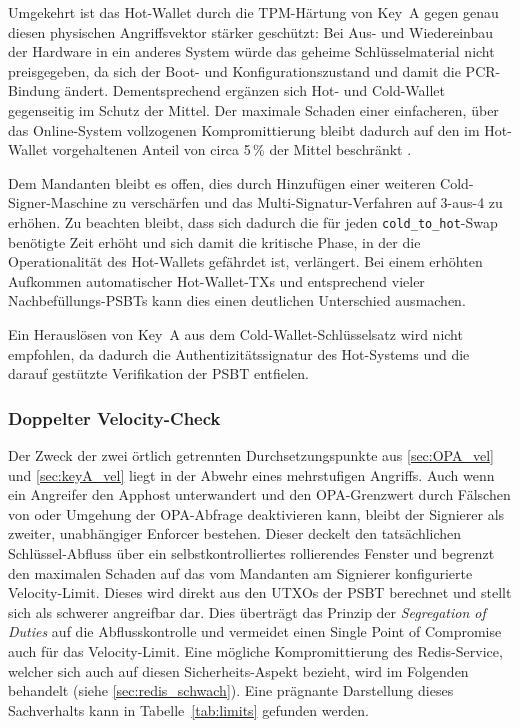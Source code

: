 Umgekehrt ist das Hot-Wallet durch die TPM-Härtung von Key~A gegen genau diesen physischen Angriffsvektor stärker geschützt: Bei Aus- und Wiedereinbau der Hardware in ein anderes System würde das geheime Schlüsselmaterial nicht preisgegeben, da sich der Boot- und Konfigurationszustand und damit die \ac{PCR}-Bindung ändert.
Dementsprechend ergänzen sich Hot- und Cold-Wallet gegenseitig im Schutz der Mittel. Der maximale Schaden einer einfacheren, über das Online-System vollzogenen Kompromittierung bleibt dadurch auf den im Hot-Wallet vorgehaltenen Anteil von circa 5\,\% der Mittel beschränkt \cite{nist_zero_trust}.

Dem Mandanten bleibt es offen, dies durch Hinzufügen einer weiteren Cold-Signer-Maschine zu verschärfen und das Multi-Signatur-Verfahren auf 3-aus-4 zu erhöhen. Zu beachten bleibt, dass sich dadurch die für jeden \texttt{cold\_to\_hot}-Swap benötigte Zeit erhöht und sich damit die kritische Phase, in der die Operationalität des Hot-Wallets gefährdet ist, verlängert. Bei einem erhöhten Aufkommen automatischer Hot-Wallet-\acp{TX} und entsprechend vieler Nachbefüllungs-\acp{PSBT} kann dies einen deutlichen Unterschied ausmachen.

Ein Herauslösen von Key~A aus dem Cold-Wallet-Schlüsselsatz wird nicht empfohlen, da dadurch die Authentizitätssignatur des Hot-Systems und die darauf gestützte Verifikation der \ac{PSBT} entfielen.

\subsubsection{Doppelter Velocity-Check} \label{sec:doppelter_velocity}
Der Zweck der zwei örtlich getrennten Durchsetzungspunkte aus \ref{sec:OPA_vel} und \ref{sec:keyA_vel} liegt in der Abwehr eines mehrstufigen Angriffs. 
Auch wenn ein Angreifer den Apphost unterwandert und den \ac{OPA}-Grenzwert durch Fälschen von \texttt{} oder Umgehung der \ac{OPA}-Abfrage deaktivieren kann, bleibt der Signierer als zweiter, unabhängiger Enforcer bestehen.
Dieser deckelt den tatsächlichen Schlüssel-Abfluss über ein selbstkontrolliertes rollierendes Fenster und begrenzt den maximalen Schaden auf das vom Mandanten am Signierer konfigurierte Velocity-Limit. Dieses wird direkt aus den \acp{UTXO} der \ac{PSBT} berechnet und stellt sich als schwerer angreifbar dar. Dies überträgt das Prinzip der \emph{Segregation of Duties} auf die Abflusskontrolle und vermeidet einen Single Point of Compromise auch für das Velocity-Limit.
Eine mögliche Kompromittierung des Redis-Service, welcher sich auch auf diesen Sicherheits-Aspekt bezieht, wird im Folgenden behandelt (siehe \ref{sec:redis_schwach}).
Eine prägnante Darstellung dieses Sachverhalts kann in Tabelle~\ref{tab:limits} gefunden werden.

